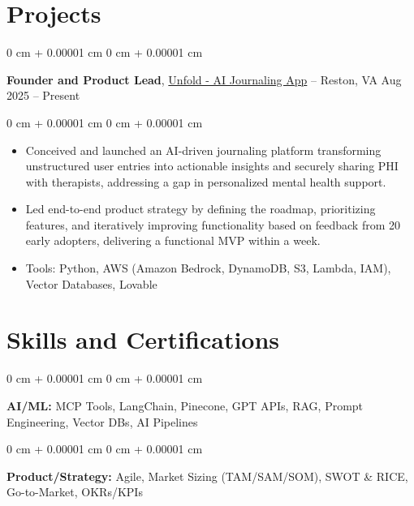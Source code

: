 \documentclass[10pt, letterpaper]{article}
\newenvironment{highlights}{
    \begin{itemize}[
        topsep=0.10 cm,
        parsep=0.10 cm,
        partopsep=0pt,
        itemsep=0pt,
        leftmargin=0 cm + 10pt
    ]
}{
    \end{itemize}
} %
\newenvironment{onecolentry}{
    \begin{adjustwidth}{
        0 cm + 0.00001 cm
    }{
        0 cm + 0.00001 cm
    }
}{
    \end{adjustwidth}
} %
\newenvironment{twocolentry}[2][]{
    \onecolentry
    \def\secondColumn{#2}
    \setcolumnwidth{\fill, 4.5 cm}
    \begin{paracol}{2}
}{
    \switchcolumn \raggedleft \secondColumn
    \end{paracol}
    \endonecolentry
} %
\begin{document}
    

    
    \section{Projects}

        \begin{twocolentry}{
            Aug 2025 – Present
        }
            \textbf{Founder and Product Lead}, \href{https://www.unfoldzone.com/signin}{Unfold - AI Journaling App} -- Reston, VA\end{twocolentry}

        \vspace{0.10 cm}
        \begin{onecolentry}
            \begin{highlights}
                \item Conceived and launched an AI-driven journaling platform transforming unstructured user entries into actionable insights and securely sharing PHI with therapists, addressing a gap in personalized mental health support.


                \item Led end-to-end product strategy by defining the roadmap, prioritizing features, and iteratively improving functionality based on feedback from 20 early adopters, delivering a functional MVP within a week.
                \item Tools: Python, AWS (Amazon Bedrock, DynamoDB, S3, Lambda, IAM), Vector Databases, Lovable

            \end{highlights}
        \end{onecolentry}



    
    \section{Skills and Certifications}



        
        \begin{onecolentry}
            \textbf{AI/ML:} MCP Tools, LangChain, Pinecone, GPT APIs, RAG, Prompt Engineering, Vector DBs, AI Pipelines

        \end{onecolentry}

        \vspace{0.1 cm}

        \begin{onecolentry}
            \textbf{Product/Strategy:} Agile, Market Sizing (TAM/SAM/SOM), SWOT \& RICE, Go-to-Market, OKRs/KPIs

        \end{onecolentry}
\end{document}
